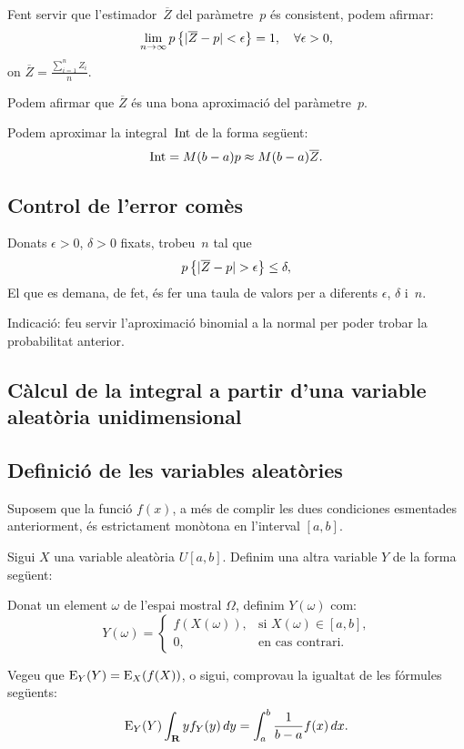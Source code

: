 Fent servir que l'estimador~$\overline{Z}$ del par\`ametre~$p$ \'es 
consistent, podem afirmar:
\[
\lim_{n\to\infty} p\left\{|\overline{Z}-p| <\epsilon\right\}= 1,\quad
\forall\epsilon >0,
\]
on $\overline{Z}=\frac{\sum\limits_{i=1}^n Z_i}{n}$.

Podem afirmar que $\overline{Z}$ \'es una bona aproximaci\'o del
par\`ametre~$p$.

Podem aproximar la integral~${\rm Int}$ de la forma seg\"uent:
\[
{\rm Int} = M(b-a) p\approx M(b-a)\overline{Z}.
\]

\subsection*{Control de l'error com\`es}

Donats $\epsilon >0$, $\delta >0$ fixats, trobeu~$n$ tal que
\[
p\left\{|\overline{Z}-p| > \epsilon\right\} \leq \delta,
\]
El que es demana, de fet, \'es fer una taula de valors per a 
diferents $\epsilon$, $\delta$ i~$n$. 

Indicaci\'o: feu servir l'aproximaci\'o binomial a la 
normal per poder trobar la probabilitat anterior.

\subsection{C\`alcul de la integral a partir d'una variable aleat\`oria 
unidimensional}

\subsection*{Definici\'o de les variables aleat\`ories}

Suposem que la funci\'o $f(x)$, a m\'es de complir les dues condiciones
esmentades anteriorment, \'es estrictament mon\`otona
 en l'interval
 $[a,b]$.

Sigui $X$ una variable aleat\`oria $U[a,b]$.
Definim una altra variable $Y$ de la forma seg\"uent:

Donat un element $\omega$ de l'espai mostral $\Omega$, 
definim $Y(\omega)$ com:
\[
Y(\omega)=
\left\{
\begin{array}{ll}
f\left(X(\omega)\right), & \mbox{si $X(\omega)\in [a,b]$,} \\
0, & \mbox{en cas contrari.}
\end{array}
\right.
\]

Vegeu que ${\rm E}_Y (Y) ={\rm E}_X (f(X))$, o sigui, comprovau la igualtat de les
f\'ormules seg\"uents:
\begin{equation}
\EE_Y (Y)\int_{\RR} y f_Y (y)\, dy = \int_a^b \frac{1}{b-a} f(x)\, dx.
\label{INTSEGFORMA}
\end{equation}

